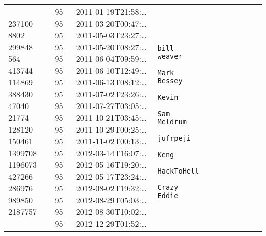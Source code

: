 \documentclass[12pt,a4paper,twoside,openright,titlepage,final]{article}
\begin{document}
\begin{enumerate}
\begin{longtable}[]{@{}lllllllllll@{}}
\begin{minipage}[t]{0.05\columnwidth}
			237100 8802 299848 564 413744 114869 388430 47040 21774 128120 150461
			1399708 1196073 427266 286976 989850 2187757
			\strut\end{minipage} &
		\begin{minipage}[t]{0.02\columnwidth}\raggedright\strut
			95 95 95 95 95 95 95 95 95 95 95 95 95 95 95 95 95 95 95
			\strut\end{minipage} &
		\begin{minipage}[t]{0.11\columnwidth}\raggedright\strut
			2011-01-19T21:58:\ldots{} 2011-03-20T00:47:\ldots{}
			2011-05-03T23:27:\ldots{} 2011-05-20T08:27:\ldots{}
			2011-06-04T09:59:\ldots{} 2011-06-10T12:49:\ldots{}
			2011-06-13T08:12:\ldots{} 2011-07-02T23:26:\ldots{}
			2011-07-27T03:05:\ldots{} 2011-10-21T03:45:\ldots{}
			2011-10-29T00:25:\ldots{} 2011-11-02T00:13:\ldots{}
			2012-03-14T16:07:\ldots{} 2012-05-16T19:20:\ldots{}
			2012-05-17T23:24:\ldots{} 2012-08-02T19:32:\ldots{}
			2012-08-29T05:03:\ldots{} 2012-08-30T10:02:\ldots{}
			2012-12-29T01:52:\ldots{}
			\strut\end{minipage} &
		\begin{minipage}[t]{0.09\columnwidth}\raggedright\strut
			\begin{verbatim}
			bill weaver
			Mark Bessey
			Kevin
			Sam Meldrum
			jufrpeji
			Keng
			HackToHell
			Crazy Eddie
			\end{verbatim}
			

\end{minipage}
\end{longtable}
\end{enumerate}
\end{document}
